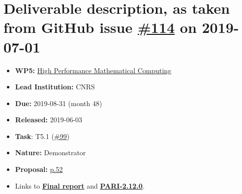 \section*{\texorpdfstring{Deliverable description, as taken from GitHub
issue
\href{https://github.com/OpenDreamKit/OpenDreamKit/issues/114}{\#114} on
2019-07-01}{Deliverable description, as taken from GitHub issue \#114 on 2019-07-01}}\label{deliverable-description-as-taken-from-github-issues-114-on-2019-07-01}

\begin{itemize}
\tightlist
\item
  \textbf{WP5:}
  \href{https://github.com/OpenDreamKit/OpenDreamKit/tree/master/WP5}{High
  Performance Mathematical Computing}
\item
  \textbf{Lead Institution:} CNRS
\item
  \textbf{Due:} 2019-08-31 (month 48)
\item
  \textbf{Released:} 2019-06-03
\item
  \textbf{Task}: T5.1
  (\href{https://github.com/OpenDreamKit/OpenDreamKit/issues/99}{\#99})
\item
  \textbf{Nature:} Demonstrator
\item
  \textbf{Proposal:}
  \href{https://github.com/OpenDreamKit/OpenDreamKit/raw/master/Proposal/proposal-www.pdf}{p.52}
\item Links to
  \underline{\textbf{\href{https://github.com/OpenDreamKit/OpenDreamKit/raw/master/WP5/D5.16/report-final.pdf}{Final report}}} and
    \underline{\textbf{\href{http://pari.math.u-bordeaux.fr/pub/pari/unstable/pari-2.12.0.alpha.tar.gz}{PARI-2.12.0\vphantom{p}}}}.
\end{itemize}

